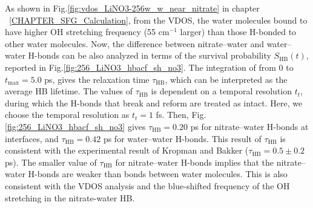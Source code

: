 As shown in Fig.\space\ref{fig:vdos_LiNO3-256w_w_near_nitrate} in chapter ~\ref{CHAPTER_SFG_Calculation}, 
from the VDOS, the water molecules bound to \nitrate have higher OH stretching frequency (55 cm$^{-1}$ larger) 
than those H-bonded to other water molecules. 
%
Now, the difference between nitrate--water and water--water H-bonds 
can be also analyzed in terms of the survival probability $S_{\text{HB}}(t)$, \cite{AKS86,JT90,AL96} 
reported in Fig.\thinspace\ref {fig:256_LiNO3_hbacf_sh_no3}.
The integration of \SHB from 0 to $t_{\max}=5.0$ ps, \cite{Steinel2004} gives the relaxation time $\tau_\text{HB}$, which can be interpreted as 
the average HB lifetime. \cite{SC02} 
The values of $\tau_{\text{HB}}$ is dependent on a temporal resolution $t_t$, during which the H-bonds that break and reform are treated as intact. \cite{AL00} 
%
Here, we choose the temporal resolution as $t_t=1$ fs. 
Then, Fig.\thinspace\ref {fig:256_LiNO3_hbacf_sh_no3} gives $\tau_\text{HB}=0.20$ ps for nitrate--water H-bonds at interfaces, and $\tau_\text{HB}=0.42$ ps for water--water H-bonds.
This result of $\tau_\text{HB}$ is consistent with the experimental result of Kropman and Bakker ($\tau_\text{HB}=0.5\pm0.2$ ps). \cite{MFK01}
The smaller value of $\tau_\text{HB}$ for nitrate--water H-bonds implies that the nitrate--water H-bonds are weaker than bonds between water molecules. 
This is also consistent with the VDOS analysis and the blue-shifted frequency of the OH stretching in the nitrate-water HB. 

\FloatBarrier
